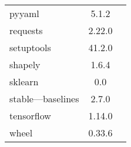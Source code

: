 \begin{longtable}{lcc}
    pyyaml             & 5.1.2                    \\
    requests           & 2.22.0                   \\
    setuptools         & 41.2.0                   \\
    shapely            & 1.6.4                    \\
    sklearn            & 0.0                      \\
    stable---baselines & 2.7.0                    \\
    tensorflow         & 1.14.0                   \\
    wheel              & 0.33.6                   \\
    \bottomrule
\end{longtable}
